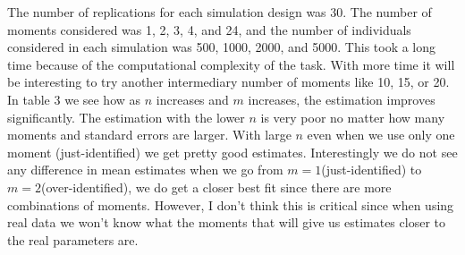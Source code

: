 \documentclass[12pt]{article}
\theoremstyle{definition}
\begin{document}
The number of replications for each simulation design was 30. The number of moments considered was 1, 2, 3, 4, and 24, and the number of individuals considered in each simulation was 500, 1000, 2000, and 5000. This took a long time because of the computational complexity of the task. With more time it will be interesting to try another intermediary number of moments like 10, 15, or 20. In table 3 we see how as $n$ increases and $m$ increases, the estimation improves significantly. The estimation with the lower $n$ is very poor no matter how many moments and standard errors are larger. With large $n$ even when we use only one moment (just-identified) we get pretty good estimates. Interestingly we do not see any difference in mean estimates when we go from $m=1$(just-identified) to $m =2$(over-identified), we do get a closer best fit since there are more combinations of moments. However, I don't think this is critical since when using real data we won't know what the moments that will give us estimates closer to the real parameters are.  
\end{document}

